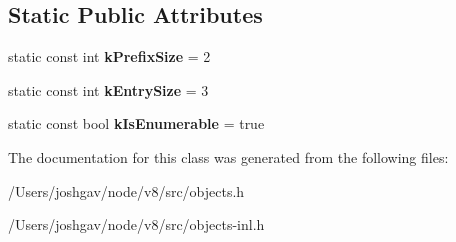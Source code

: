 \subsection*{Static Public Attributes}
\begin{DoxyCompactItemize}
\item 
static const int {\bfseries k\+Prefix\+Size} = 2\hypertarget{classv8_1_1internal_1_1_name_dictionary_shape_a1a90f5c9fdff6b8e651e80362ecaa7c2}{}\label{classv8_1_1internal_1_1_name_dictionary_shape_a1a90f5c9fdff6b8e651e80362ecaa7c2}

\item 
static const int {\bfseries k\+Entry\+Size} = 3\hypertarget{classv8_1_1internal_1_1_name_dictionary_shape_a4420336fb2913279eebec9f27a8a1334}{}\label{classv8_1_1internal_1_1_name_dictionary_shape_a4420336fb2913279eebec9f27a8a1334}

\item 
static const bool {\bfseries k\+Is\+Enumerable} = true\hypertarget{classv8_1_1internal_1_1_name_dictionary_shape_aeac8f90c4adc800a7095ae6153b60cfc}{}\label{classv8_1_1internal_1_1_name_dictionary_shape_aeac8f90c4adc800a7095ae6153b60cfc}

\end{DoxyCompactItemize}


The documentation for this class was generated from the following files\+:\begin{DoxyCompactItemize}
\item 
/\+Users/joshgav/node/v8/src/objects.\+h\item 
/\+Users/joshgav/node/v8/src/objects-\/inl.\+h\end{DoxyCompactItemize}
